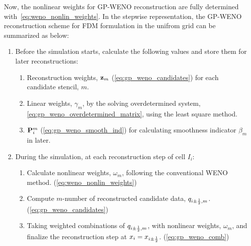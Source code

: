 Now, the nonlinear weights for GP-WENO reconstruction are fully determined
with~\cref{eq:weno_nonlin_weights}.
In the stepwise representation, the GP-WENO reconstruction scheme for FDM formulation
in the unifrom grid can be summarized as below:
\begin{enumerate}
    \item Before the simulation starts, calculate the following values and store them for later reconstructions:
        \begin{enumerate}
            \item Reconstruction weights, \( \mathbf{z}_{m} \) (\cref{eq:gp_weno_candidates}) for each candidate stencil, \( m \).
            \item Linear weights, \( \gamma_{m} \), by the solving overdetermined system, \cref{eq:gp_weno_overdetermined_matrix},
                using the least square method.
            \item \( \mathbf{P}_{i}^{m} \) (\cref{eq:gp_weno_smooth_ind}) for calculating smoothness indicator \( \beta_{m} \) in later.
        \end{enumerate}
    \item During the simulation, at each reconstruction step of cell \( I_{i} \):
        \begin{enumerate}
            \item Calculate nonlinear weights, \( \omega_{m} \), following the conventional WENO method. (\cref{eq:weno_nonlin_weights})
            \item Compute \( m \)-number of reconstructed candidate data, \( q_{i \pm \frac{1}{2}, m} \). (\cref{eq:gp_weno_candidates})
            \item Taking weighted combinations of \( q_{i \pm \frac{1}{2}, m} \), with nonlinear weights, \( \omega_{m} \),
                and finalize the reconstruction step at \( x_{i} = x_{i \pm \frac{1}{2}} \). (\cref{eq:gp_weno_comb})
        \end{enumerate}
\end{enumerate}

